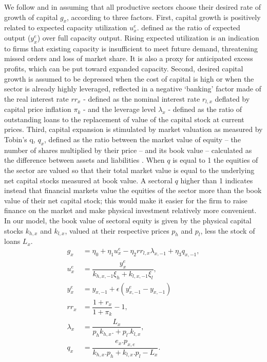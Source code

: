 \documentclass[authoryear]{article}
\begin{document}
We follow \citet{Fazzari1986} and \citet{Caiani2014} in assuming that all productive sectors choose their desired rate of growth of capital $g_{x}$, according to three factors. First, capital growth is positively related to expected capacity utilization $u_x^e$. defined as the ratio of expected output ($y_x^e$) over full capacity output. Rising expected utilization is an indication to firms that existing capacity is insufficient to meet future demand, threatening missed orders and loss of market share. It is also a proxy for anticipated excess profits, which can be put toward expanded capacity. Second, desired capital growth is assumed to be depressed when the cost of capital is high or when the sector is already highly leveraged, reflected in a negative `banking' factor made of the real interest rate $rr_{x}$ - defined as the nominal interest rate $r_{l,x}$ deflated by capital price inflation $\pi_k$ - and the leverage level $\lambda_x$ - defined as the ratio of outstanding loans to the replacement of value of the capital stock at current prices. Third, capital expansion is stimulated by market valuation as measured by Tobin's q, $q_x$, defined as the ratio between the market value of equity – the number of shares multiplied by their price – and its book value – calculated as the difference between assets and liabilities \citep{Tobin1969}. When $q$ is equal to 1 the equities of the sector are valued so that their total market value is equal to the underlying net capital stocks measured at book value. A sectoral $q$ higher than 1 indicates instead that financial markets value the equities of the sector more than the book value of their net capital stock; this would make it easier for the firm to raise finance on the market and make physical investment relatively more convenient. In our model, the book value of sectoral equity is given by the physical capital stocks $k_{h,x}$ and $k_{l,x}$, valued at their respective prices $p_h$ and $p_l$, less the stock of loans $L_x$.
\begin{align}
g_{x}&=\eta_{0} + \eta_{1} u_x^e-\eta_{2} rr_{l,x} \lambda_{x,-1}+\eta_3 q_{x,-1}, \label{eq:gx}\\
u_x^e&=\dfrac{y_x^e}{k_{h, x,-1}\xi_h+k_{l, x,-1}\xi_l},\\
y_x^e&=y_{x,-1} + \epsilon\left(y^e_{x,-1} - y_{x,-1}\right)\\
rr_x&=\dfrac{1+r_x}{1+\pi_k}-1,\\
\lambda_x&=\dfrac{L_x}{p_hk_{h,x}. +p_l.k_{l,x}},\\
q_x&=\dfrac{e_x.p_{x,e}}{k_{h,x}.p_h+k_{l,x}.p_l-L_x}.
\end{align}
\end{document}
